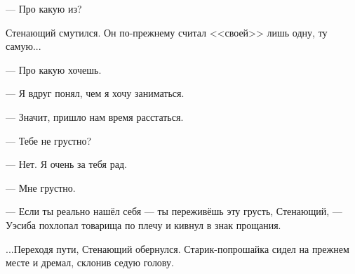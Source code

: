 \documentclass[a4paper,12pt,fleqn]{book}\usepackage{cooltooltips}\usepackage{polyglossia}\setdefaultlanguage[babelshorthands=true]{russian}\setotherlanguage{english}\defaultfontfeatures{Ligatures=TeX,Mapping=tex-text} \usepackage{xcolor}\definecolor{lightgray}{HTML}{bbbbbb}\color{lightgray}\newcommand{\ml}[3]{\textenglish{\textcolor{black}{#3}}}
\newcommand{\asterism}{\vspace{1em}{\centering\Large\bfseries$\ast~\ast~\ast$\par}\vspace{1em}}
\begin{document}
--- Про какую из?

Стенающий смутился.
Он по-прежнему считал <<своей>> лишь одну, ту самую...

--- Про какую хочешь.

\asterism

--- Я вдруг понял, чем я хочу заниматься.

--- Значит, пришло нам время расстаться.

--- Тебе не грустно?

--- Нет.
Я очень за тебя рад.

--- Мне грустно.

--- Если ты реально нашёл себя --- ты переживёшь эту грусть, Стенающий, --- Уэсиба похлопал товарища по плечу и кивнул в знак прощания.

...Переходя пути, Стенающий обернулся.
Старик-попрошайка сидел на прежнем месте и дремал, склонив седую голову.
\end{document}
